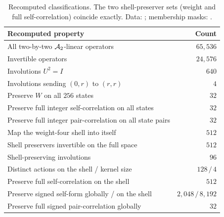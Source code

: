 \begin{table}[htbp]
\centering\small
\begin{tabularx}{\textwidth}{@{}Y r@{}}
\toprule
Recomputed property & Count\\
\midrule
All two-by-two $\mathcal A_2$-linear operators & $65{,}536$\\
Invertible operators & $24{,}576$\\
Involutions $U^2=I$ & $640$\\
Involutions sending $(0,r)$ to $(r,r)$ & $4$\\
Preserve $W$ on all $256$ states & $32$\\
Preserve full integer self-correlation on all states & $32$\\
Preserve full integer pair-correlation on all state pairs & $32$\\
Map the weight-four shell into itself & $512$\\
Shell preservers invertible on the full space & $512$\\
Shell-preserving involutions & $96$\\
Distinct actions on the shell / kernel size & $128\,/\,4$\\
Preserve full self-correlation on the shell & $512$\\
Preserve signed self-form globally / on the shell & $2{,}048\,/\,8{,}192$\\
Preserve full signed pair-correlation globally & $32$\\
\bottomrule
\end{tabularx}
\caption{Recomputed classifications. The two shell-preserver sets (weight and full self-correlation) coincide exactly. Data: ; membership masks: .}
\label{tab:finite}
\end{table}

